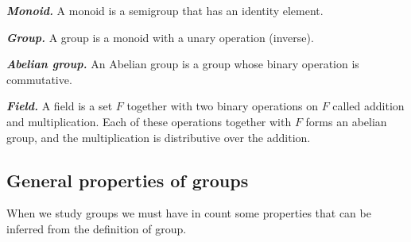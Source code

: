 \documentclass{report}
\begin{document}
    \begin{defBox}
        \textit{\textbf{Monoid.}} A monoid is a semigroup that has an identity element.
    \end{defBox}

    \begin{defBox}
        \textit{\textbf{Group.}} A group is a monoid with a unary operation (inverse).
    \end{defBox}

    \begin{defBox}
        \textit{\textbf{Abelian group.}} An Abelian group is a group whose binary operation is commutative.
    \end{defBox}

    \begin{defBox}
        \textit{\textbf{Field.}} A field is a set $F$ together with two binary operations on $F$ called addition and multiplication. Each of these operations together with $F$ forms an abelian group, and the multiplication is distributive over the addition.
    \end{defBox}

    \subsection*{General properties of groups}

    When we study groups we must have in count some properties that can be inferred from the definition of group.
\end{document}
